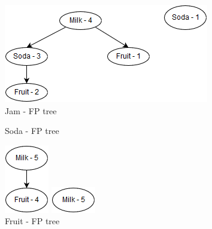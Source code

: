 \documentclass{article}
\begin{document}
\begin{flushleft}
\begin{figure}[H]
\begin{minipage}[t]{0.5\textwidth}
	\end{minipage}%
	\begin{minipage}[t]{0.5\textwidth}
		\centering
		\caption{Jam - FP tree}
		\includegraphics[scale = 0.5]{JamTree}
	\end{minipage}
\end{figure}
\begin{figure}[H]
	\centering
	\begin{minipage}[t]{0.5\textwidth}
		\centering
		\caption{Soda - FP tree}
		\includegraphics[scale = 0.5]{SodaTree}
	\end{minipage}%
	\begin{minipage}[t]{0.5\textwidth}
		\centering
		\caption{Fruit - FP tree}
		\includegraphics[scale = 0.5]{FruitTree}
	\end{minipage}
\end{figure}




\end{flushleft}
\end{document}
